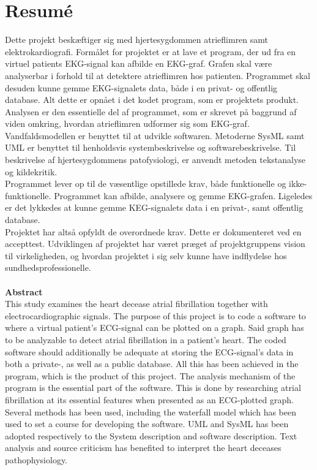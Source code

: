 \chapter{Resumé}

Dette projekt beskæftiger sig med hjertesygdommen atrieflimren samt elektrokardiografi. Formålet for projektet er at lave et program, der ud fra en virtuel patients EKG-signal kan afbilde en EKG-graf. Grafen skal være analyserbar i forhold til at detektere atrieflimren hos patienten. Programmet skal desuden kunne gemme EKG-signalets data, både i en privat- og offentlig database. Alt dette er opnået i det kodet program, som er projektets produkt. Analysen er den essentielle del af programmet, som er skrevet på baggrund af viden omkring, hvordan atrieflimren udformer sig som EKG-graf.\\
Vandfaldsmodellen er benyttet til at udvikle softwaren. Metoderne SysML samt UML er benyttet til henholdsvis systembeskrivelse og softwarebeskrivelse. Til beskrivelse af hjertesygdommens patofysiologi, er anvendt metoden tekstanalyse og kildekritik.\\
Programmet lever op til de væsentlige opstillede krav, både funktionelle og ikke-funktionelle. Programmet kan afbilde, analysere og gemme EKG-grafen. Ligeledes er det lykkedes at kunne gemme KEG-signalets data i en privat-, samt offentlig database.\\  
Projektet har altså opfyldt de overordnede krav. Dette er dokumenteret ved en accepttest. Udviklingen af projektet har været præget af projektgruppens vision til virkeligheden, og hvordan projektet i sig selv kunne have indflydelse hos sundhedsprofessionelle.\\
\\ \textbf{Abstract}\\
This study examines the heart decease atrial fibrillation together with electrocardiographic signals. The purpose of this project is to code a software to where a virtual patient’s ECG-signal can be plotted on a graph. Said graph has to be analyzable to detect atrial fibrillation in a patient’s heart. The coded software should additionally be adequate at storing the ECG-signal's data in both a private-, as well as a public database. All this has been achieved in the program, which is the product of this project. The analysis mechanism of the program is the essential part of the software. This is done by researching atrial fibrillation at its essential features when presented as an ECG-plotted graph.\\
Several methods has been used, including the waterfall model which has been used to set a course for developing the software. UML and SysML has been adopted respectively to the System description and software description. Text analysis and source criticism has benefited to interpret the heart deceases pathophysiology.\\ 
